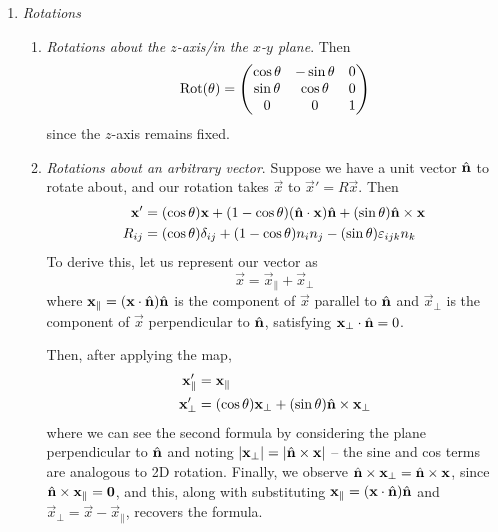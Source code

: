 \documentclass{../../template/note}
\begin{document}
    \begin{enumerate}
        \item \emph{Rotations}
        \begin{enumerate}
            \item \emph{Rotations about the \(z\)-axis/in the \(x\)-\(y\) plane}. Then
            \[
                \operatorname{Rot}(\theta) = \begin{pmatrix}
                 \cos \theta & -\sin \theta & 0 \\
                 \sin \theta & \cos \theta & 0 \\
                 0 & 0 & 1 \\
                \end{pmatrix}
            \]
            since the \(z\)-axis remains fixed.
            \item \emph{Rotations about an arbitrary vector}. Suppose we have a unit vector \(\hvec n\) to rotate about, and our rotation takes \(\vec x\) to \(\vec x' = R \vec x\). Then
            \begin{align*}
                \vec x' &= (\cos \theta) \vec x + (1 - \cos \theta) (\hvec n \cdot \vec x) \hvec n + (\sin \theta) \hvec n \times \vec x \\
                R_{ij} &= (\cos \theta) \delta_{ij} + (1 - \cos \theta) n_i n_j - (\sin \theta) \lv{ijk} n_k
            \end{align*}
            To derive this, let us represent our vector as
            \[
                \vec x = \vec x_\parallel + \vec x_\perp
            \]
            where \(\vec x_\parallel = (\vec x \cdot \hvec n) \hvec n\) is the component of \(\vec x\) parallel to \(\hvec n\) and \(\vec x_\perp\) is the component of \(\vec x\) perpendicular to \(\hvec n\), satisfying \(\vec x_\perp \cdot \hvec n = 0\).

            Then, after applying the map,
            \begin{align*}
                \vec x'_\parallel &= \vec x_\parallel \\
                \vec x'_\perp &= (\cos \theta) \vec x_\perp + (\sin \theta) \hvec n \times \vec x_\perp
            \end{align*}
            where we can see the second formula by considering the plane perpendicular to \(\hvec n\) and noting \(|\vec x_\perp| = |\hvec n \times \vec x|\) -- the sine and cos terms are analogous to 2D rotation. Finally, we observe \(\hvec n \times \vec x_\perp = \hvec n \times \vec x\), since \(\hvec n \times \vec x_\parallel = \vec 0\), and this, along with substituting \(\vec x_\parallel = (\vec x \cdot \hvec n) \hvec n\) and \(\vec x_\perp = \vec x - \vec x_\parallel\), recovers the formula.



\end{enumerate}
\end{enumerate}
\end{document}
